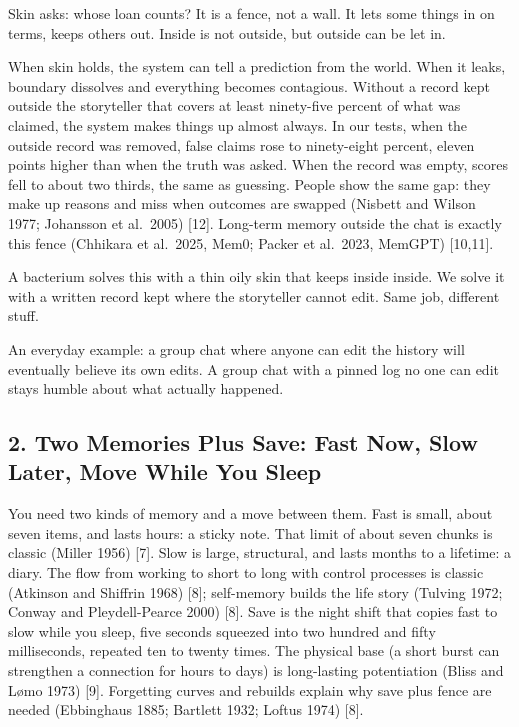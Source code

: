 \documentclass[11pt,a4paper]{article}
\begin{document}
Skin asks: whose loan counts? It is a fence, not a wall. It lets some things in on terms, keeps others out. Inside is not outside, but outside can be let in.

When skin holds, the system can tell a prediction from the world. When it leaks, boundary dissolves and everything becomes contagious. Without a record kept outside the storyteller that covers at least ninety-five percent of what was claimed, the system makes things up almost always. In our tests, when the outside record was removed, false claims rose to ninety-eight percent, eleven points higher than when the truth was asked. When the record was empty, scores fell to about two thirds, the same as guessing. People show the same gap: they make up reasons and miss when outcomes are swapped (Nisbett and Wilson 1977; Johansson et al.\ 2005) [12]. Long-term memory outside the chat is exactly this fence (Chhikara et al.\ 2025, Mem0; Packer et al.\ 2023, MemGPT) [10,11].

A bacterium solves this with a thin oily skin that keeps inside inside. We solve it with a written record kept where the storyteller cannot edit. Same job, different stuff.

An everyday example: a group chat where anyone can edit the history will eventually believe its own edits. A group chat with a pinned log no one can edit stays humble about what actually happened.

\subsection{2. Two Memories Plus Save: Fast Now, Slow Later, Move While You Sleep}

You need two kinds of memory and a move between them. Fast is small, about seven items, and lasts hours: a sticky note. That limit of about seven chunks is classic (Miller 1956) [7]. Slow is large, structural, and lasts months to a lifetime: a diary. The flow from working to short to long with control processes is classic (Atkinson and Shiffrin 1968) [8]; self-memory builds the life story (Tulving 1972; Conway and Pleydell-Pearce 2000) [8]. Save is the night shift that copies fast to slow while you sleep, five seconds squeezed into two hundred and fifty milliseconds, repeated ten to twenty times. The physical base (a short burst can strengthen a connection for hours to days) is long-lasting potentiation (Bliss and L{\o}mo 1973) [9]. Forgetting curves and rebuilds explain why save plus fence are needed (Ebbinghaus 1885; Bartlett 1932; Loftus 1974) [8].
\end{document}

